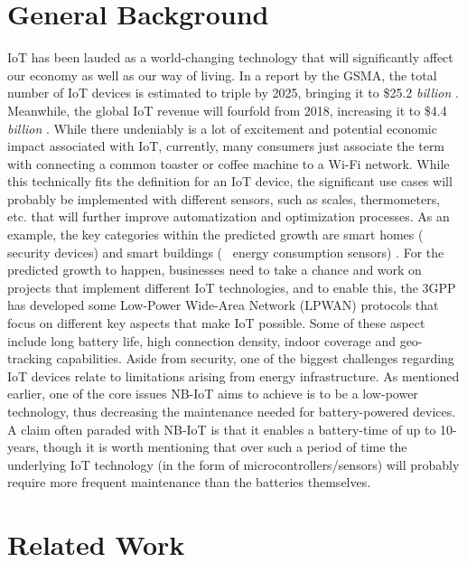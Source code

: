 


\section{General Background}
IoT has been lauded as a world-changing technology that will significantly affect our economy as well as our way of living. In a report by the GSMA, the total number of IoT devices is estimated to triple by 2025, bringing it to \$25.2 \textit{billion} \cite{gsma-report}. Meanwhile, the global IoT revenue will fourfold from 2018, increasing it to \$4.4 \textit{billion} \cite{gsma-report}. While there undeniably is a lot of excitement and potential economic impact associated with IoT, currently, many consumers just associate the term with connecting a common toaster or coffee machine to a Wi-Fi network. While this technically fits the definition for an IoT device,\cite{what_is_iot} the significant use cases will probably be implemented with different sensors, such as scales, thermometers, etc. that will further improve automatization and optimization processes. As an example, the key categories within the predicted growth are smart homes (\eg~ security devices) and smart buildings (\eg~ energy consumption sensors) \cite{gsma-report}. For the predicted growth to happen, businesses need to take a chance and work on projects that implement different IoT technologies, and to enable this, the 3GPP has developed some Low-Power Wide-Area Network (LPWAN) protocols that focus on different key aspects that make IoT possible. Some of these aspect include long battery life, high connection density, indoor coverage and geo-tracking capabilities. Aside from security, one of the biggest challenges regarding IoT devices relate to limitations arising from energy infrastructure. As mentioned earlier, one of the core issues NB-IoT aims to achieve is to be a low-power technology, thus decreasing the maintenance needed for battery-powered devices. A claim often paraded with NB-IoT is that it enables a battery-time of up to 10-years, \cite{gsma-nb-iot} though it is worth mentioning that over such a period of time the underlying IoT technology (in the form of microcontrollers/sensors) will probably require more frequent maintenance than the batteries themselves.

\section{Related Work}

